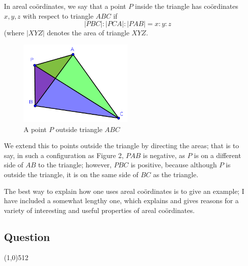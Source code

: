 \documentclass[11pt,a4paper]{report}
\let\origsection\subsection
\renewcommand{\subsection}[1]{\origsection{#1}\vspace{-0.5em}\line(1,0){512}\vspace{-1em}}
\newcounter{count}
\begin{document}
	\begin{multicols}{2}
		
		In areal coördinates, we say that a point \(P\) inside the triangle has coördinates \(x,y,z\) with respect to triangle \(ABC\) if \[|PBC|:|PCA|:|PAB|=x:y:z\]
		(where \(|XYZ|\) denotes the area of triangle \(XYZ\).
		
	\end{multicols}
	
	\setcounter{figure}{-1}
	
	\begin{figure}[h]
		\centering
		\includegraphics[width=0.5\textwidth]{areals2}
		\caption{A point \(P\) outside triangle \(ABC\)}
	\end{figure}
	
	\begin{multicols}{2}
		
		We extend this to points outside the triangle by directing the areas; that is to say, in such a configuration as Figure 2, \(PAB\) is negative, as \(P\) is on a different side of \(AB\) to the triangle; however, \(PBC\) is positive, because although \(P\) is outside the triangle, it is on the same side of \(BC\) as the triangle.
		
		The best way to explain how one uses areal coördinates is to give an example; I have included a somewhat lengthy one, which explains and gives reasons for a variety of interesting and useful properties of areal coördinates.
		
	\end{multicols}
	
	\subsection{Question}
	
\end{document}
